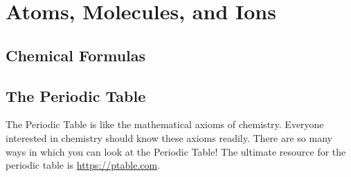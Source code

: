 \documentclass{article}
\begin{document}
\listoftodos
\section{Atoms, Molecules, and Ions}
\label{sec: a-m-i}
\subsection{Chemical Formulas}
\label{sec: chem-form}
\subsection{The Periodic Table}
\label{sec: pt}
The Periodic Table is like the mathematical axioms of chemistry. Everyone interested in chemistry should know these axioms readily. There are so many ways in which you can look at the Periodic Table! The ultimate resource for the periodic table is \url{https://ptable.com}.
\end{document}
